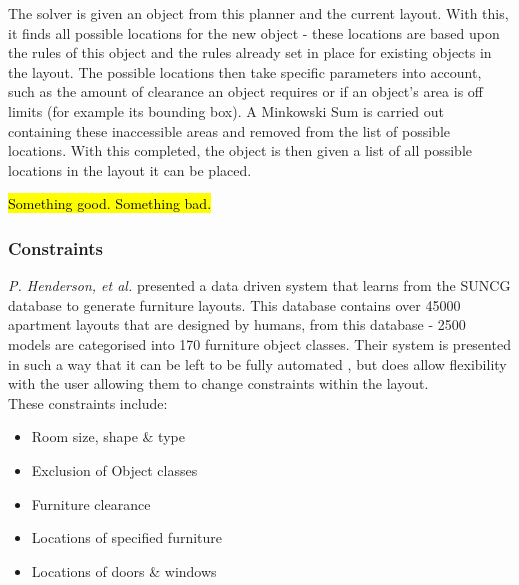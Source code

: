 The solver is given an object from this planner and the current layout. With this, it finds all possible locations for the new object - these locations are based upon the rules of this object and the rules already set in place for existing objects in the layout. The possible locations then take specific parameters into account, such as the amount of clearance an object requires or if an object's area is off limits (for example its bounding box)\cite{rule-based-layout}. A Minkowski Sum \cite{minkowski} is carried out containing these inaccessible areas and removed from the list of possible locations.
With this completed, the object is then given a list of all possible locations in the layout it can be placed.

\hl{Something good. Something bad.}

\bigskip
\subsubsection{Constraints}
\textit{P. Henderson, et al.} \cite{constrained-layouts} presented a data driven system that learns from the SUNCG \cite{suncg} database to generate furniture layouts. This database contains over 45000 apartment layouts that are designed by humans, from this database - 2500 models are categorised into 170 furniture object classes.
Their system is presented in such a way that it can be left to be fully automated \cite{constrained-layouts}, but does allow flexibility with the user allowing them to change constraints within the layout.\\
These constraints include:
\begin{itemize}
    \item Room size, shape \& type 
    \item Exclusion of Object classes
    \item Furniture clearance 
    \item Locations of specified furniture
    \item Locations of doors \& windows
\end{itemize}

